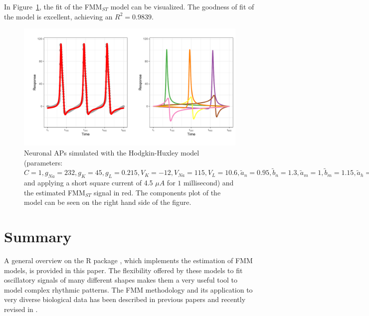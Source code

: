 In Figure~\ref{f:FigureNeuroTrain}, the fit of the FMM$_{ST}$ model can be visualized. The goodness of fit of the model is excellent, achieving an $R^2 = 0.9839$.

\begin{figure}[!ht]
\centering
\includegraphics[width=1\textwidth]{Figure_APTrain_Example}
\caption{Neuronal APs simulated with the Hodgkin-Huxley model (parameters: $C=1, g_{Na}=232, g_{K}=45, g_{L}=0.215, V_{K}=-12, V_{Na}=115, V_{L}=10.6, \widetilde{a}_n=0.95, \widetilde{b}_n=1.3, \widetilde{a}_m=1, \widetilde{b}_m=1.15, \widetilde{a}_h=1, \widetilde{b}_h=1$ and applying a short square current of 4.5 $\mu A$ for $1$ millisecond) and the estimated FMM$_{ST}$ signal in red. The components plot of the model can be seen on the right hand side of the figure.}
\label{f:FigureNeuroTrain}
\end{figure} %

\section{Summary} \label{sec:summary}
A general overview on the R package , which implements the estimation of FMM models, is provided in this paper. The flexibility offered by these models to fit oscillatory signals of many different shapes makes them a very useful tool to model complex rhythmic patterns. The FMM methodology and its application to very diverse biological data has been described in previous papers \citep{Rueda+Larriba+Peddada:2019, Rueda+Larriba+Lamela:2021, Rueda+Rodriguez+Larriba:2021} and recently revised in \cite{Rueda+Fernandez+Larriba+Rodriguez:2021}.

